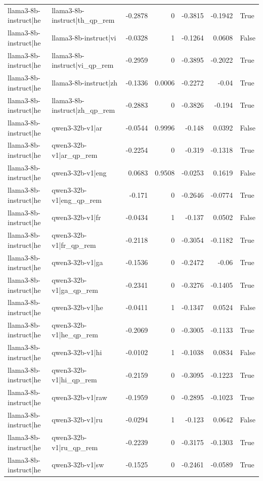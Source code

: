\begin{table}
\begin{tabular}{l l r r r r l}
llama3-8b-instruct|he & llama3-8b-instruct|th_qp_rem & -0.2878 & 0 & -0.3815 & -0.1942 & True \\
llama3-8b-instruct|he & llama3-8b-instruct|vi & -0.0328 & 1 & -0.1264 & 0.0608 & False \\
llama3-8b-instruct|he & llama3-8b-instruct|vi_qp_rem & -0.2959 & 0 & -0.3895 & -0.2022 & True \\
llama3-8b-instruct|he & llama3-8b-instruct|zh & -0.1336 & 0.0006 & -0.2272 & -0.04 & True \\
llama3-8b-instruct|he & llama3-8b-instruct|zh_qp_rem & -0.2883 & 0 & -0.3826 & -0.194 & True \\
llama3-8b-instruct|he & qwen3-32b-v1|ar & -0.0544 & 0.9996 & -0.148 & 0.0392 & False \\
llama3-8b-instruct|he & qwen3-32b-v1|ar_qp_rem & -0.2254 & 0 & -0.319 & -0.1318 & True \\
llama3-8b-instruct|he & qwen3-32b-v1|eng & 0.0683 & 0.9508 & -0.0253 & 0.1619 & False \\
llama3-8b-instruct|he & qwen3-32b-v1|eng_qp_rem & -0.171 & 0 & -0.2646 & -0.0774 & True \\
llama3-8b-instruct|he & qwen3-32b-v1|fr & -0.0434 & 1 & -0.137 & 0.0502 & False \\
llama3-8b-instruct|he & qwen3-32b-v1|fr_qp_rem & -0.2118 & 0 & -0.3054 & -0.1182 & True \\
llama3-8b-instruct|he & qwen3-32b-v1|ga & -0.1536 & 0 & -0.2472 & -0.06 & True \\
llama3-8b-instruct|he & qwen3-32b-v1|ga_qp_rem & -0.2341 & 0 & -0.3276 & -0.1405 & True \\
llama3-8b-instruct|he & qwen3-32b-v1|he & -0.0411 & 1 & -0.1347 & 0.0524 & False \\
llama3-8b-instruct|he & qwen3-32b-v1|he_qp_rem & -0.2069 & 0 & -0.3005 & -0.1133 & True \\
llama3-8b-instruct|he & qwen3-32b-v1|hi & -0.0102 & 1 & -0.1038 & 0.0834 & False \\
llama3-8b-instruct|he & qwen3-32b-v1|hi_qp_rem & -0.2159 & 0 & -0.3095 & -0.1223 & True \\
llama3-8b-instruct|he & qwen3-32b-v1|raw & -0.1959 & 0 & -0.2895 & -0.1023 & True \\
llama3-8b-instruct|he & qwen3-32b-v1|ru & -0.0294 & 1 & -0.123 & 0.0642 & False \\
llama3-8b-instruct|he & qwen3-32b-v1|ru_qp_rem & -0.2239 & 0 & -0.3175 & -0.1303 & True \\
llama3-8b-instruct|he & qwen3-32b-v1|sw & -0.1525 & 0 & -0.2461 & -0.0589 & True \\

\end{tabular}
\end{table}
